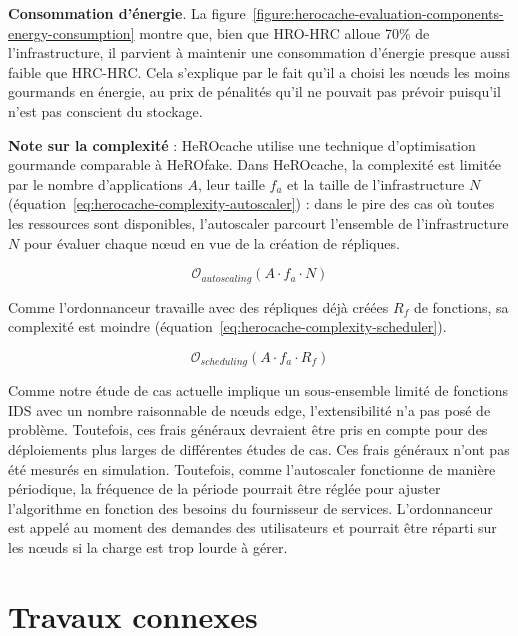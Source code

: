\textbf{Consommation d'énergie}. La figure~\ref{figure:herocache-evaluation-components-energy-consumption} montre que, bien que HRO-HRC alloue 70\% de l'infrastructure, il parvient à maintenir une consommation d'énergie presque aussi faible que HRC-HRC. Cela s'explique par le fait qu'il a choisi les nœuds les moins gourmands en énergie, au prix de pénalités qu'il ne pouvait pas prévoir puisqu'il n'est pas conscient du stockage.

\textbf{Note sur la complexité} : HeROcache utilise une technique d'optimisation gourmande comparable à HeROfake. Dans HeROcache, la complexité est limitée par le nombre d'applications $A$, leur taille $f_{a}$ et la taille de l'infrastructure $N$ (équation~\ref{eq:herocache-complexity-autoscaler}) : dans le pire des cas où toutes les ressources sont disponibles, l'autoscaler parcourt l'ensemble de l'infrastructure $N$ pour évaluer chaque nœud en vue de la création de répliques.

\begin{equation}
    \mathcal{O}_{autoscaling}(A \cdot f_{a} \cdot N)
\label{eq:herocache-complexity-autoscaler}
\end{equation}

Comme l'ordonnanceur travaille avec des répliques déjà créées $R_{f}$ de fonctions, sa complexité est moindre (équation~\ref{eq:herocache-complexity-scheduler}).

\begin{equation}
    \mathcal{O}_{scheduling}(A \cdot f_{a} \cdot R_{f})
\label{eq:herocache-complexity-scheduler}
\end{equation}

Comme notre étude de cas actuelle implique un sous-ensemble limité de fonctions IDS avec un nombre raisonnable de nœuds edge, l'extensibilité n'a pas posé de problème. Toutefois, ces frais généraux devraient être pris en compte pour des déploiements plus larges de différentes études de cas. Ces frais généraux n'ont pas été mesurés en simulation. Toutefois, comme l'autoscaler fonctionne de manière périodique, la fréquence de la période pourrait être réglée pour ajuster l'algorithme en fonction des besoins du fournisseur de services. L'ordonnanceur est appelé au moment des demandes des utilisateurs et pourrait être réparti sur les nœuds si la charge est trop lourde à gérer.

\section{Travaux connexes}
\label{section:herocache-sota}

